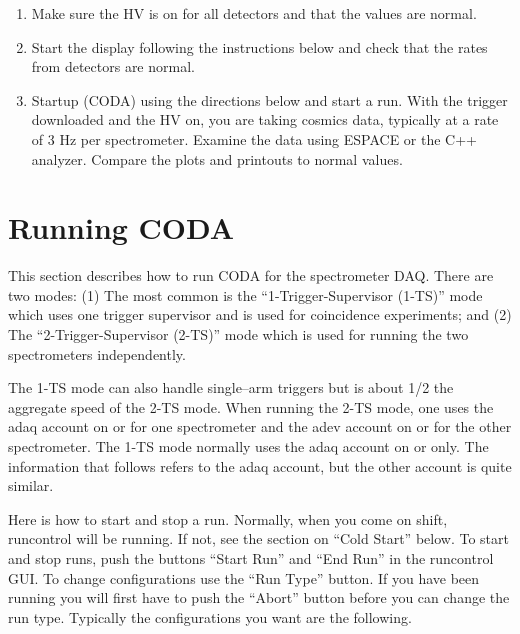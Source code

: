 {{\begin{enumerate}
\item{Make sure the HV is on for all detectors
and that the values are normal.}

\item{Start the 
display following the instructions below and
check that the rates from detectors are normal.}

\item{Startup  (CODA) using the directions below
and start a run.  With the trigger downloaded
and the HV on, you are taking cosmics data, typically at
a rate of 3 Hz per spectrometer.
Examine the data using ESPACE or the C++ analyzer.
Compare the plots and printouts to normal values.}

\end{enumerate}

\section{Running CODA}

\par
This section describes how to run CODA for
the spectrometer DAQ.  There are two modes:
(1) The most common is the ``1-Trigger-Supervisor (1-TS)''
mode which uses one trigger supervisor and
is used for coincidence experiments; and
(2) The ``2-Trigger-Supervisor (2-TS)'' mode which
is used for running the two spectrometers
independently.

\par
The 1-TS mode can also handle single--arm
triggers but is about 1/2 the aggregate speed
of the 2-TS mode.  When running the 2-TS
mode, one uses the adaq account on  or   for one
spectrometer and the adev account on  or 
for the other spectrometer.
The 1-TS mode normally uses the
adaq account on  or   only.
The information that follows refers to
the adaq account, but the other account is quite similar.

\par

Here is how to start and stop a run.
Normally, when you come on shift,
runcontrol will be running.  If not,
see the section on ``Cold Start'' below.
To start and stop runs, push the buttons
``Start Run'' and ``End Run'' in the
runcontrol GUI.   To change configurations
use the ``Run Type'' button.  If you have
been running you will first have to push the
``Abort'' button before you can change the
run type. Typically the configurations
you want are the following.

}}
